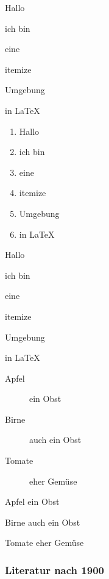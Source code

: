 \documentclass[12pt,ngerman,parskip=half]{scrreprt}
\begin{document}
\begin{compactitem}[\textcolor{red}{$\Rightarrow$}]
	\item Hallo
	\item ich bin
	\item eine 
	\item itemize
	\item Umgebung
	\item in LaTeX
\end{compactitem}

\begin{enumerate}
	\item Hallo
	\item ich bin
	\item eine 
	\item itemize 
	\item Umgebung
	\item in LaTeX
\end{enumerate}

\begin{compactenum}[1.] \setcounter{enumi}{2} 
	\item Hallo
	\item ich bin
	\item eine 
	\item itemize 
	\item Umgebung
	\item in LaTeX
\end{compactenum}

\begin{description}
\item[Apfel] ein Obst
\item[Birne] auch ein Obst
\item[Tomate] eher Gemüse
\end{description}

\begin{compactdesc}
\item[Apfel] ein Obst
\item[Birne] auch ein Obst
\item[Tomate] eher Gemüse
\end{compactdesc}


\blindtext

\blindtext

\subsubsection{Literatur nach 1900}

\blindtext
\end{document}
